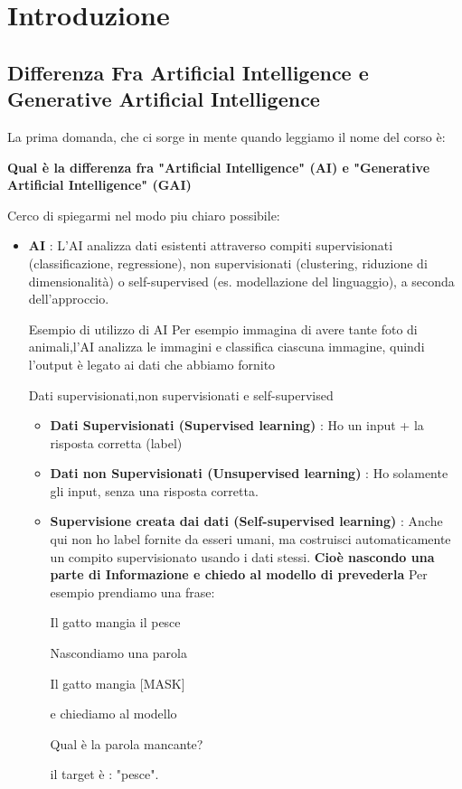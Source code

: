 \chapter{Introduzione}
\section{Differenza Fra Artificial Intelligence e Generative Artificial Intelligence}
La prima domanda, che ci sorge in mente quando leggiamo il nome del corso è:
\begin{center}
    \textbf{Qual è la differenza fra "Artificial Intelligence" (AI) e "Generative Artificial Intelligence" (GAI)}
\end{center}
Cerco di spiegarmi nel modo piu chiaro possibile:
\begin{itemize}
    \item \textbf{AI} : L'AI analizza dati esistenti attraverso compiti supervisionati (classificazione, regressione), 
    non supervisionati (clustering, riduzione di dimensionalità) o self-supervised 
    (es. modellazione del linguaggio), a seconda dell'approccio.
    \begin{example}{Esempio di utilizzo di AI}
        Per esempio immagina di avere tante foto di animali,l'AI analizza le immagini e classifica ciascuna immagine, quindi l'output è legato
        ai dati che abbiamo fornito
    \end{example}
    \begin{observation}{Dati supervisionati,non supervisionati e self-supervised}
        \begin{itemize}
            \item \textbf{Dati Supervisionati (Supervised learning)} : Ho un input + la risposta corretta (label)
            \item \textbf{Dati non Supervisionati (Unsupervised learning)} : Ho solamente gli input, senza una risposta corretta.
            \item \textbf{Supervisione creata dai dati (Self-supervised learning)} : Anche qui non ho label fornite da esseri umani, 
            ma costruisci automaticamente un compito supervisionato usando i dati stessi. \textbf{Cioè nascondo una parte di Informazione
            e chiedo al modello di prevederla}
            Per esempio prendiamo una frase:
            \begin{center}
                Il gatto mangia il pesce
            \end{center}
            Nascondiamo una parola
            \begin{center}
                Il gatto mangia [MASK]
            \end{center}
            e chiediamo al modello
            \begin{center}
                Qual è la parola mancante?
            \end{center}
            il target è : "pesce".


\end{itemize}
\end{observation}
\end{itemize}
